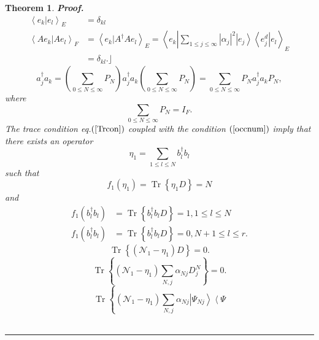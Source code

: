 \documentclass[aps,preprint]{revtex4}%
\newtheorem{theorem}{Theorem}
\newenvironment{proof}[1][Proof]{\noindent\textbf{#1.} }{\ \rule{0.5em}{0.5em}}
\begin{document}
\begin{theorem}
\begin{proof}
\begin{align}
\left\langle \left.  e_{k}\right\vert e_{l}\right\rangle _{E}  &  =\delta
_{kl}\nonumber\\
\left\langle \left.  Ae_{k}\right\vert Ae_{l}\right\rangle _{F}  &
=\left\langle \left.  e_{k}\right\vert A^{\dagger}Ae_{l}\right\rangle
_{E}=\left\langle e_{k}\left\vert \sum_{1\leq j\leq\infty}\left\vert
\alpha_{j}\right\vert ^{2}\left\vert e_{j}\right\rangle \left\langle e_{j}%
^{d}\right\vert e_{l}\right.  \right\rangle _{E}\nonumber\\
&  =\delta_{kl}.\rfloor
\end{align}%
\begin{equation}
a_{j}^{\dagger}a_{k}=\left(  \sum_{0\leq N\leq\infty}P_{N}\right)
a_{j}^{\dagger}a_{k}\left(  \sum_{0\leq N\leq\infty}P_{N}\right)  =\sum_{0\leq
N\leq\infty}P_{N}a_{j}^{\dagger}a_{k}P_{N},
\end{equation}
where%
\begin{equation}
\sum_{0\leq N\leq\infty}P_{N}=I_{F}.
\end{equation}
The trace condition eq.$\left(  \ref{Trcon}\right)  $ coupled with the
condition $\left(  \ref{occnum}\right)  $ imply that there exists an operator
\begin{equation}
\eta_{1}=\sum_{1\leq l\leq N}b_{l}^{\dagger}b_{l}%
\end{equation}
such that
\begin{equation}
f_{1}\left(  \eta_{1}\right)  =\operatorname*{Tr}\left\{  \eta_{1}D\right\}
=N
\end{equation}
and
\begin{align}
f_{1}\left(  b_{l}^{\dagger}b_{l}\right)   &  =\operatorname*{Tr}\left\{
b_{l}^{\dagger}b_{l}D\right\}  =1,1\leq l\leq N\\
f_{1}\left(  b_{l}^{\dagger}b_{l}\right)   &  =\operatorname*{Tr}\left\{
b_{l}^{\dagger}b_{l}D\right\}  =0,N+1\leq l\leq r.
\end{align}%
\begin{equation}
\operatorname*{Tr}\left\{  \left(  \mathcal{N}_{1}-\eta_{1}\right)  D\right\}
=0.
\end{equation}%
\begin{equation}
\operatorname*{Tr}\left\{  \left(  \mathcal{N}_{1}-\eta_{1}\right)  \sum
_{N,j}\alpha_{Nj}D_{j}^{N}\right\}  =0.
\end{equation}%
\begin{equation}
\operatorname*{Tr}\left\{  \left(  \mathcal{N}_{1}-\eta_{1}\right)  \sum
_{N,j}\alpha_{Nj}\left\vert \Psi_{Nj}\right\rangle \left\langle \Psi

\end{equation}
\end{proof}
\end{theorem}
\end{document}
